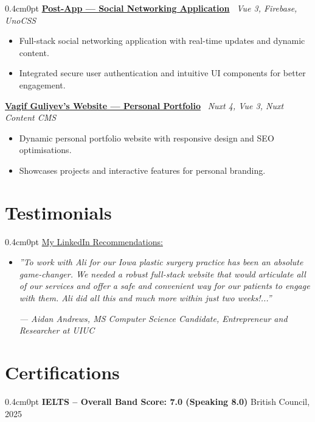 \documentclass[a4paper,10pt]{article}
\newcommand{\Project}[3]{%
    \noindent \href{#2}{\textbf{#1}} \textbar~\textit{#3}%
    \vspace{0.2em}%
}
\begin{document}
\begin{adjustwidth}{0.4cm}{0pt}
\Project{Post-App — Social Networking Application}{https://postapp-v1.web.app/}{Vue 3, Firebase, UnoCSS}
\begin{itemize}
    \item Full-stack social networking application with real-time updates and dynamic content.
    \item Integrated secure user authentication and intuitive UI components for better engagement.
\end{itemize}

\Project{Vagif Guliyev's Website — Personal Portfolio}{https://guliyev.com}{Nuxt 4, Vue 3, Nuxt Content CMS}
\begin{itemize}
    \item Dynamic personal portfolio website with responsive design and SEO optimisations.
    \item Showcases projects and interactive features for personal branding.
\end{itemize}
\end{adjustwidth}

\section*{Testimonials}
\begin{adjustwidth}{0.4cm}{0pt}
\href{https://www.linkedin.com/in/ali-guliyev-bb7211219/details/recommendations/}{My LinkedIn Recommendations:}
\begin{itemize}
    \item \textit{”To work with Ali for our Iowa plastic surgery practice has been an absolute game-changer. We needed a robust full-stack website that would articulate all of our services and offer a safe and convenient way for our patients to engage with them. Ali did all this and much more within just two weeks!...”}
    
    \hfill \textit{— Aidan Andrews, MS Computer Science Candidate, Entrepreneur and Researcher at UIUC}
\end{itemize}
\end{adjustwidth}

\section*{Certifications}
\begin{adjustwidth}{0.4cm}{0pt}
\textbf{IELTS – Overall Band Score: 7.0 (Speaking 8.0)} \hfill British Council, 2025
\end{adjustwidth}
\end{document}

